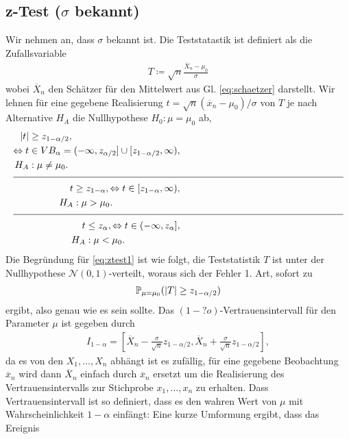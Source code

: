 \subsection{z-Test ($\sigma$ bekannt)}
Wir nehmen an, dass $\sigma$ bekannt ist. Die Teststatastik ist definiert als die Zufallsvariable
\begin{gather*}
	T\coloneqq \sqrt{n}\frac{\overline{X}_n-\mu_0}{\sigma}
\end{gather*}
wobei $\overline{X}_n$ den Schätzer für den Mittelwert aus Gl. \ref{eq:schaetzer} darstellt. Wir lehnen für eine gegebene Realisierung $t=\sqrt{n}(\overline{x}_n-\mu_0)/\sigma$ von $T$ je nach Alternative $H_A$ die Nullhypothese $H_0:\mu=\mu_0$ ab, 
\begin{align}
	\begin{split}\label{eq:ztest1}
		\abs{t}&\geq z_{1-\alpha/2},\\
		\Leftrightarrow t &\in VB_{\alpha}=(-\infty,z_{\alpha/2}]\cup [z_{1-\alpha/2},\infty),\\
			H_A&:\mu\neq\mu_0.
	\end{split}\\
	\intertext{\colorlet{rulecolor}{black}\rule{\columnwidth}{0.1ex}}
	\begin{split}\label{eq:ztest2}
		t&\geq z_{1-\alpha},
		\Leftrightarrow t \in [z_{1-\alpha},\infty),\\
			H_A&:\mu>\mu_0.
	\end{split}\\
	\intertext{\colorlet{rulecolor}{black}\rule{\columnwidth}{0.1ex}}
	\begin{split}\label{eq:ztest3}
		t&\leq z_{\alpha},
		\Leftrightarrow t \in (-\infty,z_{\alpha}],\\
		H_A&:\mu<\mu_0.
	\end{split}
\end{align}
Die Begründung für \ref{eq:ztest1} ist wie folgt, die Teststatistik $T$ ist unter der Nullhypothese $\mathcal{N}(0,1)$-verteilt, woraus sich der Fehler 1. Art, sofort zu
\begin{gather*}
	\mathbb P_{\mu=\mu_0}(\left\lvert T \right\rvert\geq z_{1-\alpha/2})
\end{gather*}
ergibt, also genau wie es sein sollte. Das $(1-?o)$-Vertrauensintervall für den Parameter $\mu$ ist gegeben durch
\begin{gather*}
	I_{1-\alpha}=\left[ \overline{X}_n-\frac{\sigma}{\sqrt{n}}z_{1-\alpha/2},\overline{X}_n+\frac{\sigma}{\sqrt{n}}z_{1-\alpha/2} \right],
\end{gather*}
da es von den $X_1,\ldots,X_n$ abhängt ist es zufällig, für eine gegebene Beobachtung $\overline{x}_n$ wird dann $\overline{X}_n$ einfach durch $\overline{x}_n$ ersetzt um die Realisierung des Vertrauensintervalls zur Stichprobe $x_1,\ldots,x_n$ zu erhalten. Dass Vertrauensintervall ist so definiert, dass es den wahren Wert von $\mu$ mit Wahrscheinlichkeit $1-\alpha$ \glqq einfängt\grqq: Eine kurze Umformung ergibt, dass das Ereignis 
